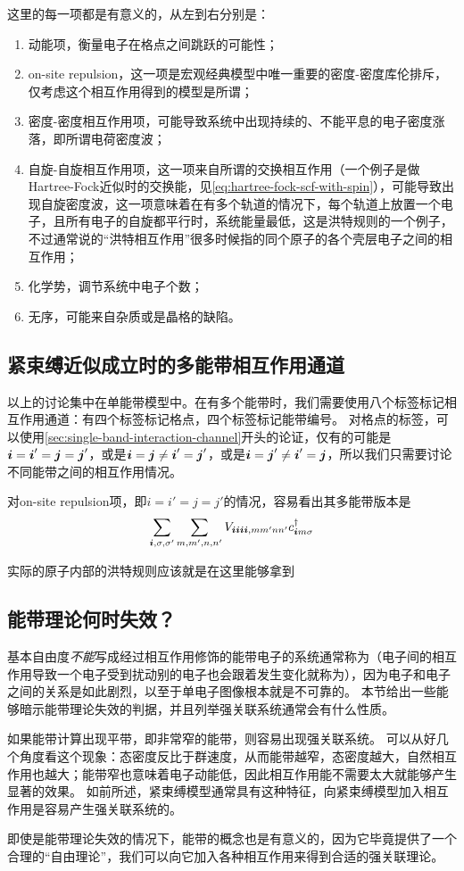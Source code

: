 这里的每一项都是有意义的，从左到右分别是：
\begin{enumerate}
    \item 动能项，衡量电子在格点之间跳跃的可能性；
    \item on-site repulsion，这一项是宏观经典模型中唯一重要的密度-密度库伦排斥，仅考虑这个相互作用得到的模型是所谓；
    \item 密度-密度相互作用项，可能导致系统中出现持续的、不能平息的电子密度涨落，即所谓电荷密度波；
    \item 自旋-自旋相互作用项，这一项来自所谓的交换相互作用（一个例子是做Hartree-Fock近似时的交换能，见\eqref{eq:hartree-fock-scf-with-spin}），可能导致出现自旋密度波，这一项意味着在有多个轨道的情况下，每个轨道上放置一个电子，且所有电子的自旋都平行时，系统能量最低，这是洪特规则的一个例子，不过通常说的“洪特相互作用”很多时候指的同个原子的各个壳层电子之间的相互作用；
    \item 化学势，调节系统中电子个数；
    \item 无序，可能来自杂质或是晶格的缺陷。
\end{enumerate}

\subsection{紧束缚近似成立时的多能带相互作用通道}

以上的讨论集中在单能带模型中。在有多个能带时，我们需要使用八个标签标记相互作用通道：有四个标签标记格点，四个标签标记能带编号。
对格点的标签，可以使用\autoref{sec:single-band-interaction-channel}开头的论证，仅有的可能是$\vb*{i}=\vb*{i}'=\vb*{j}=\vb*{j}'$，或是$\vb*{i}=\vb*{j} \neq \vb*{i}'=\vb*{j}'$，或是$\vb*{i}=\vb*{j}' \neq \vb*{i}' = \vb*{j}$，所以我们只需要讨论不同能带之间的相互作用情况。

对on-site repulsion项，即$i=i'=j=j'$的情况，容易看出其多能带版本是
\[
    \sum_{\vb*{i}, \sigma, \sigma'} \sum_{m, m', n, n'} V_{\vb*{i} \vb*{i} \vb*{i} \vb*{i},mm' nn'} c^\dagger_{\vb*{i} m \sigma} 
\]

实际的原子内部的洪特规则应该就是在这里能够拿到

\subsection{能带理论何时失效？}

基本自由度\emph{不能}写成经过相互作用修饰的能带电子的系统通常称为（电子间的相互作用导致一个电子受到扰动别的电子也会跟着发生变化就称为），因为电子和电子之间的关系是如此剧烈，以至于单电子图像根本就是不可靠的。
本节给出一些能够暗示能带理论失效的判据，并且列举强关联系统通常会有什么性质。

如果能带计算出现平带，即非常窄的能带，则容易出现强关联系统。
可以从好几个角度看这个现象：态密度反比于群速度，从而能带越窄，态密度越大，自然相互作用也越大；能带窄也意味着电子动能低，因此相互作用能不需要太大就能够产生显著的效果。
如前所述，紧束缚模型通常具有这种特征，向紧束缚模型加入相互作用是容易产生强关联系统的。

即使是能带理论失效的情况下，能带的概念也是有意义的，因为它毕竟提供了一个合理的“自由理论”，我们可以向它加入各种相互作用来得到合适的强关联理论。